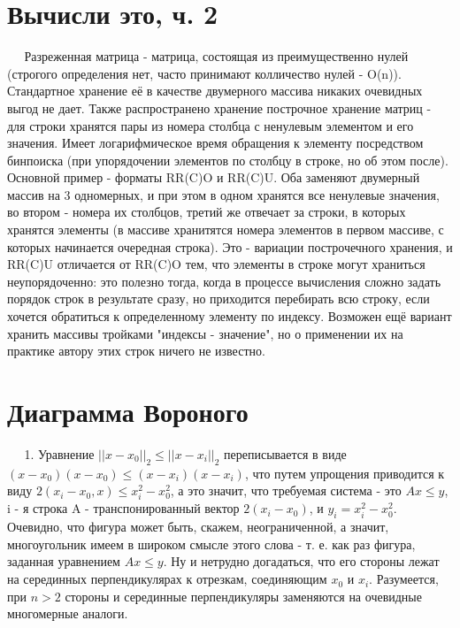 \documentclass{article}
\begin{document}
\section{Вычисли это, ч. 2}
 
 $\; \; \; \; \;$Разреженная матрица - матрица, состоящая из преимущественно нулей (строгого определения нет, часто принимают колличество нулей - O(n)). Стандартное хранение её в качестве двумерного массива никаких очевидных выгод не дает. Также распространено хранение построчное хранение матриц - для строки хранятся пары из номера столбца с ненулевым элементом и его значения. Имеет логарифмическое время обращения к элементу посредством бинпоиска (при упорядочении элементов по столбцу в строке, но об этом после). Основной пример - форматы RR(C)O и RR(C)U. Оба заменяют двумерный массив на 3 одномерных, и при этом в одном хранятся все ненулевые значения, во втором - номера их столбцов, третий же отвечает за строки, в которых хранятся элементы (в массиве хранитятся номера элементов в первом массиве, с которых начинается очередная строка). Это -  вариации построчечного хранения, и RR(C)U отличается от RR(C)O тем, что элементы в строке могут храниться неупорядоченно: это полезно тогда, когда в процессе вычисления сложно задать порядок строк в результате сразу, но приходится перебирать всю строку, если хочется обратиться к определенному элементу по индексу. Возможен ещё вариант хранить массивы тройками "индексы - значение", но о применении их на практике автору этих строк ничего не известно.

\section{Диаграмма Вороного}

$\; \; \; \; \;$1.  Уравнение $||x - x_0||_2 \leq ||x - x_i||_2$ переписывается в виде $(x - x_0)(x - x_0) \leq (x - x_i)(x - x_i)$, что путем упрощения приводится к виду $ 2(x_i - x_0, x) \leq x_i^2 - x_0^2$, а это значит, что требуемая система - это $Ax \leq y$, i - я строка A -  транспонированный вектор  $2(x_i - x_0)$, и $y_i = x_i^2 - x_0^2$. Очевидно, что фигура может быть, скажем, неограниченной, а значит, многоугольник имеем в широком смысле этого слова - т. е. как раз фигура, заданная уравнением $Ax \leq y$. Ну и нетрудно догадаться, что его стороны лежат на серединных перпендикулярах к отрезкам, соединяющим $x_0$ и $x_i$. Разумеется, при $n > 2$ стороны и серединные перпендикуляры заменяются на очевидные многомерные аналоги.
\end{document}
